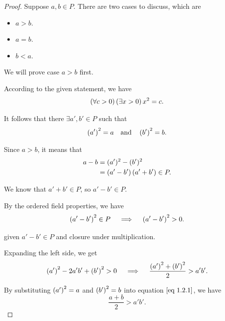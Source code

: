 \begin{enumerate}[label=(\Roman*)]
\begin{proof}
        Suppose $a, b \in P$. There are two cases to discuss, which are 
        \begin{itemize}
            \item $a > b$. 
            \item $a = b$. 
            \item $b < a$. 
        \end{itemize}

        We will prove case $a > b$ first. 
        
        According to the given statement, we have
        \begin{equation*}
            \left(\forall c > 0\right)\left(\exists x > 0\right) x^2 = c.
        \end{equation*}

        It follows that there $\exists a', b' \in P$ such that
        \begin{equation*}
            \left(a'\right)^2 = a
            \quad \text{and} \quad
            \left(b'\right)^2 = b.
        \end{equation*}

        Since $a > b$, it means that 
        \begin{align*}
            a - b &= (a')^2 - (b')^2 \\
            &= \left(a' - b'\right) \left(a' + b' \right) \in P. 
        \end{align*}

        We know that $a' + b' \in P$, so $a' - b' \in P$.  

        By the ordered field properties, we have
        \begin{equation*}
            \left(a' - b'\right)^2 \in P \quad \implies \quad \left(a' - b'\right)^2 > 0.
        \end{equation*}

        given $a' - b' \in P$ and closure under multiplication. 

        Expanding the left side, we get
        \begin{equation}
            \left(a'\right)^2 - 2a'b' + \left(b'\right)^2 > 0
            \quad \implies \quad
            \frac{\left(a'\right)^2 + \left(b'\right)^2}{2} > a'b'.
            \label{eq 1.2.1}
        \end{equation}

        By substituting $\left(a'\right)^2 = a$ and $\left(b'\right)^2 = b$ into equation $\eqref{eq 1.2.1}$, we have
        \begin{equation*}
            \frac{a + b}{2} > a'b'.
        \end{equation*}


\end{proof}
\end{enumerate}
